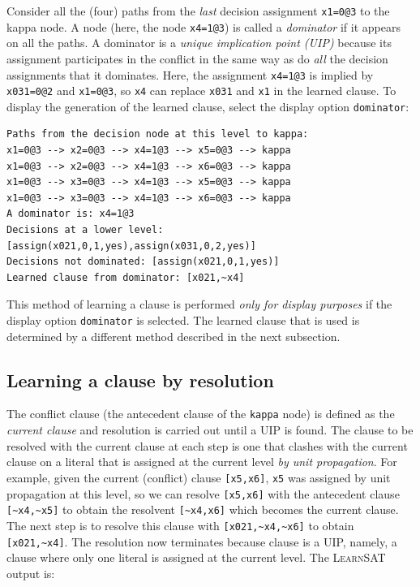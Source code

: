 \documentclass[11pt]{report}
\newcommand*{\p}[1]{\textup{\texttt{#1}}}
\newcommand*{\ls}{\textsc{LearnSAT}}
\begin{document}
Consider all the (four) paths from the \emph{last} decision assignment
\p{x1=0@3} to the kappa node. A node (here, the node \p{x4=1@3}) is
called a \emph{dominator} if it appears on all the paths. A dominator is
a \emph{unique implication point (UIP)} because its assignment
participates in the conflict in the same way as do \emph{all} the
decision assignments that it dominates. Here, the assignment \p{x4=1@3}
is implied by \p{x031=0@2} and \p{x1=0@3}, so \p{x4} can replace
\p{x031} and \p{x1} in the learned clause. To display the generation of
the learned clause, select the display option \p{dominator}:

\begin{verbatim}
Paths from the decision node at this level to kappa:
x1=0@3 --> x2=0@3 --> x4=1@3 --> x5=0@3 --> kappa
x1=0@3 --> x2=0@3 --> x4=1@3 --> x6=0@3 --> kappa
x1=0@3 --> x3=0@3 --> x4=1@3 --> x5=0@3 --> kappa
x1=0@3 --> x3=0@3 --> x4=1@3 --> x6=0@3 --> kappa
A dominator is: x4=1@3
Decisions at a lower level: [assign(x021,0,1,yes),assign(x031,0,2,yes)]
Decisions not dominated: [assign(x021,0,1,yes)]
Learned clause from dominator: [x021,~x4]
\end{verbatim}

This method of learning a clause is performed \emph{only for display
purposes} if the display option \p{dominator} is selected. The learned
clause that is used is determined by a different method described in the
next subsection.

\subsection{Learning a clause by resolution}

The conflict clause (the antecedent clause of the \p{kappa} node) is
defined as the \emph{current clause} and resolution is carried out until
a UIP is found. The clause to be resolved with the current clause at
each step is one that clashes with the current clause on a literal that
is assigned at the current level \emph{by unit propagation}. For
example, given the current (conflict) clause \p{[x5,x6]}, \p{x5} was
assigned by unit propagation at this level, so we can resolve
\p{[x5,x6]} with the antecedent clause \verb+[~x4,~x5]+ to obtain the
resolvent \verb+[~x4,x6]+ which becomes the current clause. The next
step is to resolve this clause with \verb+[x021,~x4,~x6]+ to obtain
\verb+[x021,~x4]+. The resolution now terminates
because clause is a UIP, namely, a clause where only one literal is
assigned at the current level. The \ls{} output is:
\end{document}
